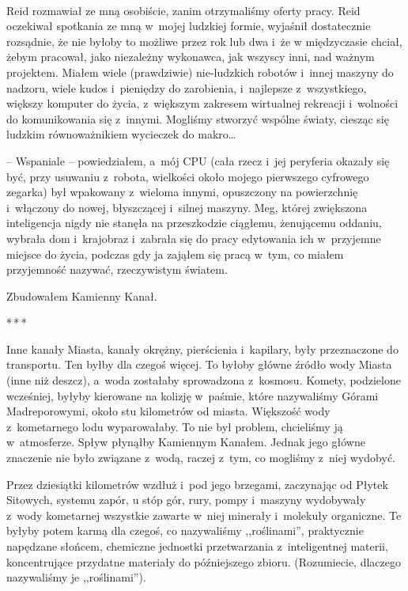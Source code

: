 \documentclass[oneside,polish,11pt,sfheadings]{mwbk}
\newcommand{\threeast}{\bigskip\par\centerline{*\,*\,*}\medskip\par}
\begin{document}
~

Reid rozmawiał ze mną osobiście, zanim otrzymaliśmy oferty pracy. Reid
oczekiwał spotkania ze mną w~mojej ludzkiej formie, wyjaśnił
dostatecznie rozsądnie, że nie byłoby to możliwe przez rok lub dwa i~że
w międzyczasie chciał, żebym pracował, jako niezależny wykonawca, jak
wszyscy inni, nad ważnym projektem. Miałem wiele (prawdziwie)
nie-ludzkich robotów i~innej maszyny do nadzoru, wiele kudos i~pieniędzy
do zarobienia, i~najlepsze z~wszystkiego, większy komputer do życia, z~większym zakresem wirtualnej rekreacji i~wolności do komunikowania się z~innymi. Mogliśmy stworzyć wspólne światy, ciesząc się ludzkim
równoważnikiem wycieczek do makro\ldots

-- Wspaniale -- powiedziałem, a~mój CPU (cała rzecz i~jej peryferia
okazały się być, przy usuwaniu z~robota, wielkości około mojego
pierwszego cyfrowego zegarka) był wpakowany z~wieloma innymi, opuszczony
na powierzchnię i~włączony do nowej, błyszczącej i~silnej maszyny. Meg,
której zwiększona inteligencja nigdy nie stanęła na przeszkodzie
ciągłemu, żenującemu oddaniu, wybrała dom i~krajobraz i~zabrała się do
pracy edytowania ich w~przyjemne miejsce do życia, podczas gdy ja
zająłem się pracą w~tym, co miałem przyjemność nazywać, rzeczywistym
światem.

Zbudowałem Kamienny Kanał.

\threeast

Inne kanały Miasta, kanały okrężny, pierścienia i~kapilary, były
przeznaczone do transportu. Ten byłby dla czegoś więcej. To byłoby
główne źródło wody Miasta (inne niż deszcz), a~woda zostałaby
sprowadzona z~kosmosu. Komety, podzielone wcześniej, byłyby kierowane na
kolizję w~paśmie, które nazywaliśmy Górami Madreporowymi, około stu
kilometrów od miasta. Większość wody z~kometarnego lodu wyparowałaby. To
nie był problem, chcieliśmy ją w~atmosferze. Spływ płynąłby Kamiennym
Kanałem. Jednak jego główne znaczenie nie było związane z~wodą, raczej z~tym, co mogliśmy z~niej wydobyć.

Przez dziesiątki kilometrów wzdłuż i~pod jego brzegami, zaczynając od
Płytek Sitowych, systemu zapór, u stóp gór, rury, pompy i~maszyny
wydobywały z~wody kometarnej wszystkie zawarte w~niej minerały i~molekuły organiczne. Te byłyby potem karmą dla czegoś, co nazywaliśmy
,,roślinami'', praktycznie napędzane słońcem, chemiczne jednostki
przetwarzania z~inteligentnej materii, koncentrujące przydatne materiały
do późniejszego zbioru. (Rozumiecie, dlaczego nazywaliśmy je
,,roślinami'').
\end{document}
